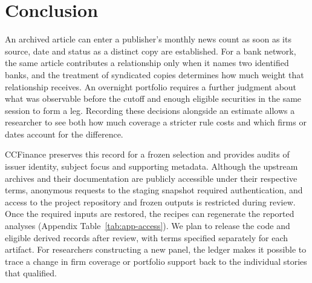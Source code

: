 \section{Conclusion}
\label{sec:conclusion}

An archived article can enter a publisher's monthly news count as soon
as its source, date and status as a distinct copy are established.
For a bank network, the same article contributes a relationship only
when it names two identified banks, and the treatment of syndicated
copies determines how much weight that relationship receives. An
overnight portfolio requires a further judgment about what was
observable before the cutoff and enough eligible securities in the
same session to form a leg. Recording these decisions alongside an
estimate allows a researcher to see both how much coverage a stricter
rule costs and which firms or dates account for the difference.

CCFinance preserves this record for a frozen selection and provides
audits of issuer identity, subject focus and supporting metadata.
Although the upstream archives and their documentation are publicly
accessible under their respective terms, anonymous requests to the
staging snapshot required authentication, and access to the project
repository and frozen outputs is restricted during review. Once the
required inputs are restored, the recipes can regenerate the reported
analyses (Appendix Table~\ref{tab:app-access}). We plan to release the
code and eligible derived records after review, with terms specified
separately for each artifact. For researchers constructing a new panel,
the ledger makes it possible to trace a change in firm coverage or
portfolio support back to the individual stories that qualified.
